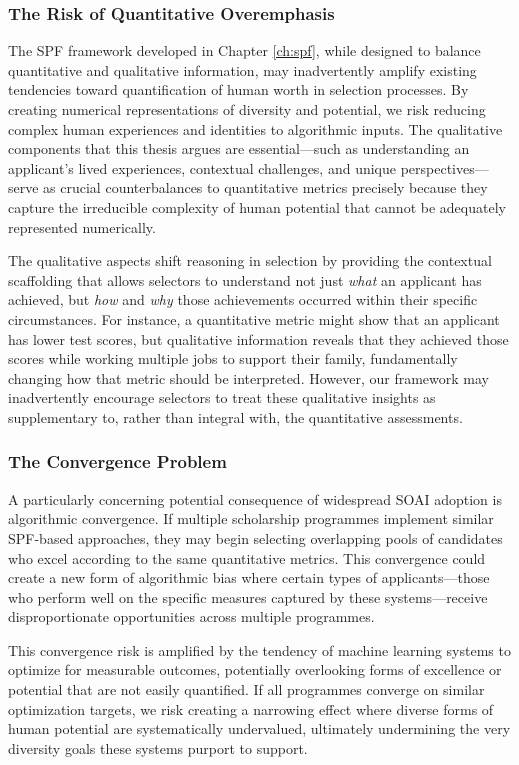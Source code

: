\subsubsection{The Risk of Quantitative Overemphasis}
The SPF framework developed in Chapter \ref{ch:spf}, while designed to balance quantitative and qualitative information, may inadvertently amplify existing tendencies toward quantification of human worth in selection processes. By creating numerical representations of diversity and potential, we risk reducing complex human experiences and identities to algorithmic inputs. The qualitative components that this thesis argues are essential—such as understanding an applicant's lived experiences, contextual challenges, and unique perspectives—serve as crucial counterbalances to quantitative metrics precisely because they capture the irreducible complexity of human potential that cannot be adequately represented numerically.

The qualitative aspects shift reasoning in selection by providing the contextual scaffolding that allows selectors to understand not just \emph{what} an applicant has achieved, but \emph{how} and \emph{why} those achievements occurred within their specific circumstances. For instance, a quantitative metric might show that an applicant has lower test scores, but qualitative information reveals that they achieved those scores while working multiple jobs to support their family, fundamentally changing how that metric should be interpreted. However, our framework may inadvertently encourage selectors to treat these qualitative insights as supplementary to, rather than integral with, the quantitative assessments.

\subsubsection{The Convergence Problem}
A particularly concerning potential consequence of widespread SOAI adoption is algorithmic convergence. If multiple scholarship programmes implement similar SPF-based approaches, they may begin selecting overlapping pools of candidates who excel according to the same quantitative metrics. This convergence could create a new form of algorithmic bias where certain types of applicants—those who perform well on the specific measures captured by these systems—receive disproportionate opportunities across multiple programmes.

This convergence risk is amplified by the tendency of machine learning systems to optimize for measurable outcomes, potentially overlooking forms of excellence or potential that are not easily quantified. If all programmes converge on similar optimization targets, we risk creating a narrowing effect where diverse forms of human potential are systematically undervalued, ultimately undermining the very diversity goals these systems purport to support.

